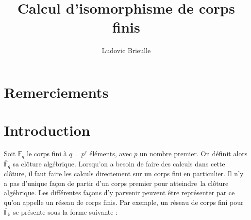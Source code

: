 \documentclass[a4paper]{article} %
\numberwithin{section}{part}
\numberwithin{equation}{section}
\newcommand\GF[1]{\mathbb{F}_{#1}}
\begin{document}
\title{Calcul d'isomorphisme de corps finis}
\author{Ludovic Brieulle}
\newtheorem{thm}{Théorème}[section]
\newtheorem{lem}[thm]{Lemme}
\newtheorem{cor}[thm]{Corollaire}
\newtheorem{prop}[thm]{Proposition}
\theoremstyle{definition}
\newtheorem{defn}[thm]{Définition}
\newtheorem*{ex}{Exemple}
\theoremstyle{remark}
\newtheorem*{rem}{Remarque}

\maketitle
\part*{Remerciements}

\part*{Introduction}
Soit $\GF{q}$ le corps fini à $q = p^r$ éléments, avec $p$ un nombre premier. On
définit alors $\overline{\mathbb{F}}_q$ sa clôture algébrique. Lorsqu'on a 
besoin de faire des calculs dans cette clôture, il faut faire les calculs
directement sur un corps fini en particulier. Il n'y a pas d'unique façon de
partir d'un corps premier pour \og atteindre\fg\, la clôture algébrique. Les
différentes façons d'y parvenir peuvent être représenter par ce qu'on appelle 
un réseau de corps finis. Par exemple, un réseau de corps fini pour 
$\overline{\mathbb{F}}_5$ se présente sous la forme suivante :

\begin{center}
\end{center}
\end{document}
